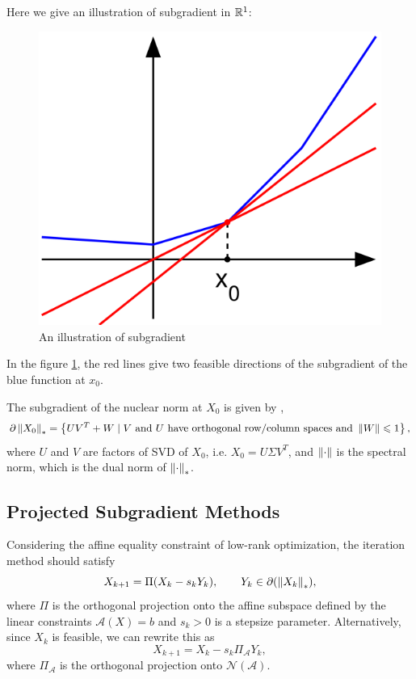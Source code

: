 \documentclass[11pt]{article}
\begin{document}
Here we give an illustration of subgradient in \(\mathbb R^1\):
\begin{figure}[H]
    \centering
    \includegraphics[scale=0.3]{img/Subderivative_illustration.png}
    \setlength{\abovecaptionskip}{0cm}
    \caption{An illustration of subgradient}
    \label{fig:subgradient}
\end{figure}

In the figure \ref{fig:subgradient}, the red lines give two feasible directions of the subgradient of the blue function at \(x_0\).

\begin{proposition}
    The subgradient of the nuclear norm at \(X_0\) is given by \cite{lewis2003mathematics},\cite{watson1992characterization}
    \[\partial \left\|X_0\right\|_* = \left\{UV^T+W \mid V \textnormal{ and } U\textnormal{ have orthogonal row/column spaces and } \left\|W\right\| \leqslant 1 \right\},\]
    where \(U\) and \(V\) are factors of SVD of \(X_0\), i.e. \(X_0=U\Sigma V^T\), and \(\left\|\cdot\right\|\) is the spectral norm, which is the dual norm of \(\left\|\cdot\right\|_*\).
\end{proposition}


\subsection{Projected Subgradient Methods}

Considering the affine equality constraint of low-rank optimization, the iteration method should satisfy
\[X_{k+1}= \Pi(X_k-s_k Y_k), \qquad Y_k \in \partial (\left\|X_k\right\|_*),\]
where \(\Pi\) is the orthogonal projection onto the affine subspace defined by the linear constraints \(\mathcal{A}(X)=b\) and \(s_{k}>0\) is a stepsize parameter. Alternatively, since \(X_{k}\) is feasible, we can rewrite this as
\[
X_{k+1}=X_{k}-s_{k} \Pi_{\mathcal{A}} Y_{k},
\]
where \(\Pi_{\mathcal{A}}\) is the orthogonal projection onto \(\mathcal{N}(\mathcal{A})\).
\end{document}
